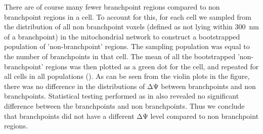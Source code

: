 There are of course many fewer branchpoint regions compared to non branchpoint regions in a cell. To account for this, for each cell we sampled from the distribution of all non branchpoint voxels (defined as not lying within \SI{300}{\nm} of a branchpoint) in the mitochondrial network to construct a bootstrapped population of 'non-branchpoint' regions. The sampling population was equal to the number of branchpoints in that cell.
The mean of all the bootstrapped 'non-branchpoint' regions was then plotted as a green dot for the cell, and repeated for all cells in all populations (). As can be seen from the violin plots in the figure, there was no difference in the distributions of ΔΨ between branchpoints and non branchpoints. Statistical testing performed as in  also revealed no significant difference between the branchpoints and non branchpoints. Thus we conclude that branchpoints did not have a different ΔΨ level compared to non branchpoint regions.
